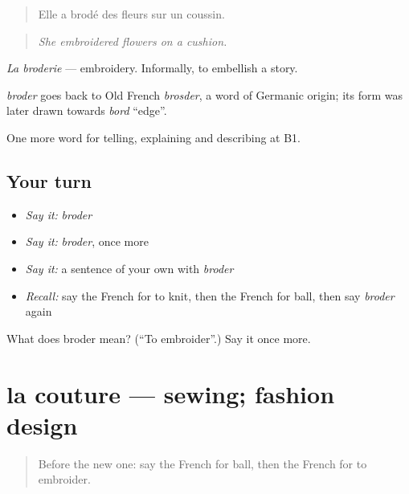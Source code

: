 \begin{quote}
Elle a brodé des fleurs sur un coussin.
\end{quote}

\begin{quote}
\emph{She embroidered flowers on a cushion.}
\end{quote}

\emph{La broderie} — embroidery. Informally, to embellish a story.

\begin{cousinweb}
\emph{broder} goes back to Old French \emph{brosder}, a word of Germanic origin; its form was later drawn towards \emph{bord} \textquotedblleft{}edge\textquotedblright{}.
\end{cousinweb}

\begin{grammarlens}[title={What you've built}]
One more word for telling, explaining and describing at B1.
\end{grammarlens}

\subsection*{Your turn}
\begin{itemize}
\raggedright
  \item \emph{Say it:} \emph{broder}
  \item \emph{Say it:} \emph{broder}, once more
  \item \emph{Say it:} a sentence of your own with \emph{broder}
  \item \emph{Recall:} say the French for to knit, then the French for ball, then say \emph{broder} again
\end{itemize}

\begin{tcolorbox}[breakable,colback=teal!4,colframe=teal!35!black,title={Before you move on}]
What does broder mean? (\textquotedblleft{}To embroider\textquotedblright{}.) Say it once more.
\end{tcolorbox}
\section[la couture]{la couture — sewing; fashion design}

\label{lesson:FR-C496-couture}



\begin{quote}
Before the new one: say the French for ball, then the French for to embroider.
\end{quote}

